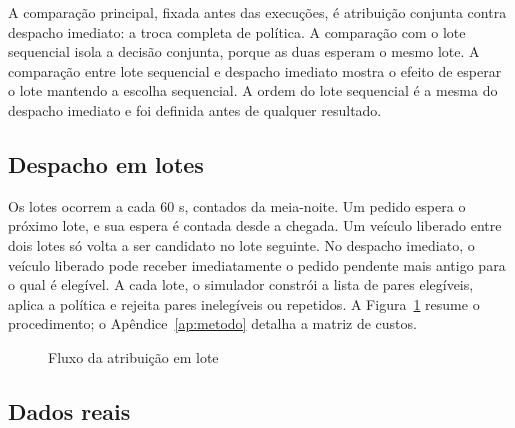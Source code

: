 A comparação principal, fixada antes das execuções, é atribuição conjunta contra despacho imediato: a troca completa de política. A comparação com o lote sequencial isola a decisão conjunta, porque as duas esperam o mesmo lote. A comparação entre lote sequencial e despacho imediato mostra o efeito de esperar o lote mantendo a escolha sequencial. A ordem do lote sequencial é a mesma do despacho imediato e foi definida antes de qualquer resultado.

\subsection{Despacho em lotes}

Os lotes ocorrem a cada 60 s, contados da meia-noite. Um pedido espera o próximo lote, e sua espera é contada desde a chegada. Um veículo liberado entre dois lotes só volta a ser candidato no lote seguinte. No despacho imediato, o veículo liberado pode receber imediatamente o pedido pendente mais antigo para o qual é elegível. A cada lote, o simulador constrói a lista de pares elegíveis, aplica a política e rejeita pares inelegíveis ou repetidos. A Figura~\ref{fig:fluxo} resume o procedimento; o Apêndice~\ref{ap:metodo} detalha a matriz de custos.

\begin{figure}[!htb]
\caption{Fluxo da atribuição em lote}\label{fig:fluxo}
\centering
{}
\par{}
\end{figure}

\subsection{Dados reais}

